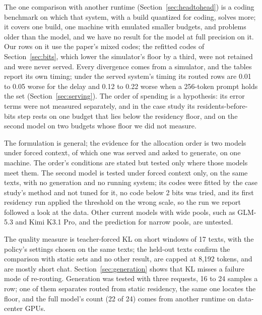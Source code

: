 \documentclass[11pt]{article}
\begin{document}
The one comparison with another runtime (Section~\ref{sec:headtohead}) is a coding benchmark on which that system, with a build quantized for coding, solves more; it covers one build, one machine with emulated smaller budgets, and problems older than the model, and we have no result for the model at full precision on it. Our rows on it use the paper's mixed codes; the refitted codes of Section~\ref{sec:bits}, which lower the simulator's floor by a third, were not retained and were never served. Every divergence comes from a simulator, and the tables report its own timing; under the served system's timing its routed rows are 0.01 to 0.05 worse for the delay and 0.12 to 0.22 worse when a 256-token prompt holds the set (Section~\ref{sec:serving}). The order of spending is a hypothesis: its error terms were not measured separately, and in the case study its residents-before-bits step rests on one budget that lies below the residency floor, and on the second model on two budgets whose floor we did not measure.

The formulation is general; the evidence for the allocation order is two models under forced
context, of which one was served and asked to generate, on one machine. The order's conditions are stated but tested only where those models meet them. The second model is tested under forced context only, on the same texts, with no generation and no running system; its codes were fitted by the case study's method and not tuned for it, no code below 2 bits was tried, and its first residency run applied the threshold on the wrong scale, so the run we report followed a look at the data. Other current
models with wide pools, such as GLM-5.3 and Kimi K3.1 Pro, and the prediction
for narrow pools, are untested.

The quality measure is teacher-forced KL on short windows of 17 texts, with the policy's
settings chosen on the same texts; the held-out texts confirm the comparison with static sets and no other result, are capped at 8{,}192 tokens, and are mostly short chat. Section~\ref{sec:generation} shows that KL misses a
failure mode of re-routing. Generation was tested with three requests, 16 to 24 samples a row; one of them separates routed from static residency, the same one locates the floor, and the full model's
count (22 of 24) comes from another runtime on data-center GPUs.
\end{document}
